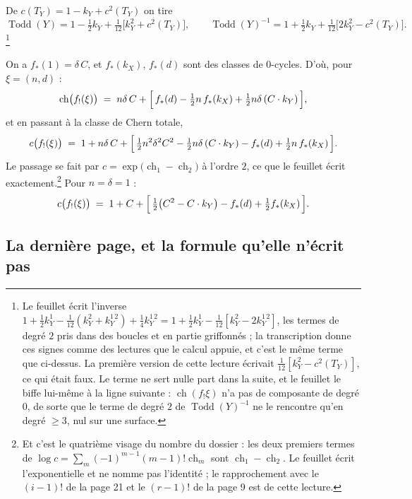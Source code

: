 \documentclass[11pt,a4paper]{article}
\begin{document}
De $c(T_{Y}) = 1 - k_{Y} + c^{2}(T_{Y})$ on tire
\[
  \operatorname{Todd}(Y) = 1 - \tfrac{1}{2}k_{Y}
  + \tfrac{1}{12}\bigl[k_{Y}^{2} + c^{2}(T_{Y})\bigr],
  \qquad
  \operatorname{Todd}(Y)^{-1} = 1 + \tfrac{1}{2}k_{Y}
  + \tfrac{1}{12}\bigl[2k_{Y}^{2} - c^{2}(T_{Y})\bigr] .
\]
\footnote{Le feuillet écrit l'inverse $1 + \tfrac12 k_{Y}^{1} -
\tfrac{1}{12}(k_{Y}^{2} + k_{Y}^{1\,2}) + \tfrac14 k_{Y}^{1\,2} = 1 + \tfrac12
k_{Y}^{1} - \tfrac{1}{12}[k_{Y}^{2} - 2k_{Y}^{1\,2}]$, les termes de degré $2$
pris dans des boucles et en partie griffonnés ; la transcription donne ces
signes comme des lectures que le calcul appuie, et c'est le même terme que
ci-dessus. La première version de cette lecture écrivait
$\tfrac{1}{12}[k_{Y}^{2} - c^{2}(T_{Y})]$, ce qui était faux. Le terme ne sert
nulle part dans la suite, et le feuillet le biffe lui-même à la ligne
suivante : $\operatorname{ch}(f_{!}\xi)$ n'a pas de composante de degré $0$,
de sorte que le terme de degré $2$ de $\operatorname{Todd}(Y)^{-1}$ ne le
rencontre qu'en degré $\geqslant 3$, nul sur une surface.}

On a $f_{*}(1) = \delta\,C$, et $f_{*}(k_{X})$, $f_{*}(d)$ sont des classes de
$0$-cycles. D'où, pour $\xi = (n,d)$ :
\[
  \operatorname{ch}\bigl(f_{!}(\xi)\bigr)
  \;=\; n\delta\,C + \Bigl[\,f_{*}(d) - \tfrac{1}{2}n\,f_{*}(k_{X})
  + \tfrac{1}{2}n\delta\,(C\cdot k_{Y})\,\Bigr],
\]
et en passant à la classe de Chern totale,
\[
  c\bigl(f_{!}(\xi)\bigr) \;=\; 1 + n\delta\,C
  + \Bigl[\,\tfrac{1}{2}n^{2}\delta^{2}C^{2} - \tfrac{1}{2}n\delta\,(C\cdot k_{Y})
  - f_{*}(d) + \tfrac{1}{2}n\,f_{*}(k_{X})\,\Bigr].
\]
Le passage se fait par $c = \exp\bigl(\operatorname{ch}_{1} -
\operatorname{ch}_{2}\bigr)$ à l'ordre $2$, ce que le feuillet écrit
exactement.\footnote{Et c'est le quatrième visage du nombre du dossier : les
deux premiers termes de $\log c = \sum_{m}(-1)^{m-1}(m-1)!\operatorname{ch}_{m}$
sont $\operatorname{ch}_{1} - \operatorname{ch}_{2}$. Le feuillet écrit
l'exponentielle et ne nomme pas l'identité ; le rapprochement avec le $(i-1)!$
de la page 21 et le $(r-1)!$ de la page 9 est de cette lecture.} Pour
$n = \delta = 1$ :
\[
  c\bigl(f_{!}(\xi)\bigr) \;=\; 1 + C
  + \Bigl[\,\tfrac{1}{2}\bigl(C^{2} - C\cdot k_{Y}\bigr) - f_{*}(d)
  + \tfrac{1}{2}f_{*}(k_{X})\,\Bigr].
\]

\subsection*{La dernière page, et la formule qu'elle n'écrit pas}
\end{document}
